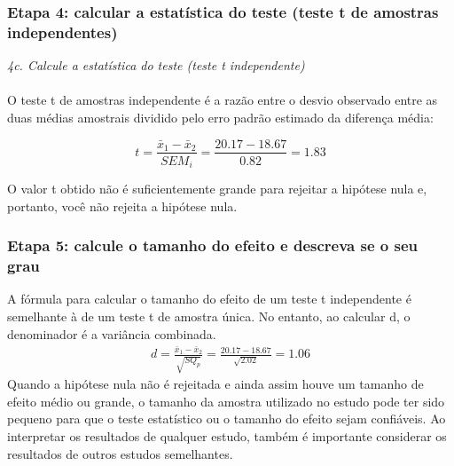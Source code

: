 \documentclass[11pt]{beamer}
\begin{document}
\begin{frame}
\frametitle{Etapa 4: calcular a estatística do teste (teste t de amostras independentes)}

\textit{4c. Calcule a estatística do teste (teste t independente)}\\~\\

O teste t de amostras independente é a razão entre o desvio observado entre as duas médias amostrais dividido pelo erro padrão estimado da diferença média:

\[t = \frac{\bar{x}_1-\bar{x}_2}{SEM_i} =  \frac{20.17 - 18.67}{0.82} = 1.83\]

O valor t obtido não é suficientemente grande para rejeitar a hipótese nula e, portanto, você não rejeita a hipótese nula.

\end{frame}


\begin{frame}
\frametitle{Etapa 5: calcule o tamanho do efeito e descreva se o seu grau}
A fórmula para calcular o tamanho do efeito de um teste t independente é semelhante à de um teste t de amostra única. No entanto, ao calcular d, o denominador é a variância combinada. 
\begin{align*}
d = \frac{\bar{x}_1 - \bar{x}_2}{\sqrt{SQ_p}} = \frac{20.17-18.67}{\sqrt{2.02}} = 1.06
\end{align*}
Quando a hipótese nula não é rejeitada e ainda assim houve um tamanho de efeito médio ou grande, o tamanho da amostra utilizado no estudo pode ter sido pequeno para que o teste estatístico ou o tamanho do efeito sejam confiáveis. Ao interpretar os resultados de qualquer estudo, também é importante considerar os resultados de outros estudos semelhantes.

\end{frame}
\end{document}
